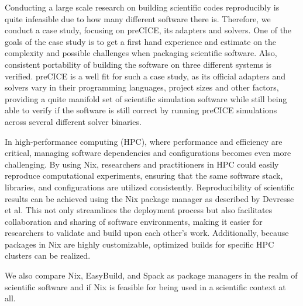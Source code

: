 \documentclass[conference,final,a4paper]{IEEEtran}
\begin{document}
Conducting a large scale research on building scientific codes reproducibly is quite infeasible due to how many different software there is.
Therefore, we conduct a case study, focusing on preCICE\cite{preCICEv2}, its adapters and solvers.
One of the goals of the case study is to get a first hand experience and estimate on the complexity and possible challenges when packaging scientific software.
Also, consistent portability of building the software on three different systems is verified.
preCICE is a well fit for such a case study, as its official adapters and solvers vary in their programming languages, project sizes and other factors, providing a quite manifold set of scientific simulation software while still being able to verify if the software is still correct by running preCICE simulations across several different solver binaries.

In high-performance computing (HPC), where performance and efficiency are critical, managing software dependencies and configurations becomes even more challenging.
By using Nix, researchers and practitioners in HPC could easily reproduce computational experiments, ensuring that the same software stack, libraries, and configurations are utilized consistently.
Reproducibility of scientific results can be achieved using the Nix package manager as described by Devresse et al.\cite{Devresse_2015}
This not only streamlines the deployment process but also facilitates collaboration and sharing of software environments, making it easier for researchers to validate and build upon each other's work.
Additionally, because packages in Nix are highly customizable, optimized builds for specific HPC clusters can be realized.

We also compare Nix, EasyBuild, and Spack as package managers in the realm of scientific software and if Nix is feasible for being used in a scientific context at all.
\end{document}
